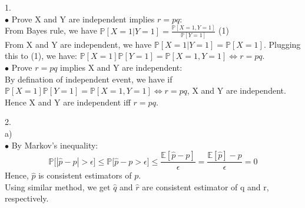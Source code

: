 \documentclass[10pt]{article}
\newenvironment{problem}[2][Problem]{\begin{trivlist}
\item[\hskip \labelsep {\bfseries #1}\hskip \labelsep {\bfseries #2.}]}{\end{trivlist}}
\begin{document}
\begin{problem}{3}
\item 1.\\
$\bullet$ Prove X and Y are independent implies $r=pq$:\\
From Bayes rule, we have $\mathbb{P}[X=1|Y=1]=\frac{\mathbb{P}[X=1, Y=1]}{\mathbb{P}[Y=1]}$ (1) \\
From X and Y are independent, we have $\mathbb{P}[X=1|Y=1]=\mathbb{P}[X=1] $. Plugging this to (1), we have: 
$\mathbb{P}[X=1] \mathbb{P}[Y=1]=\mathbb{P}[X=1, Y=1] \Leftrightarrow r=pq$.\\
$\bullet$ Prove $r=pq$ implies X and Y are independent: \\
By defination of independent event, we have if $\mathbb{P}[X=1]\mathbb{P}[Y=1]=\mathbb{P}[X=1, Y=1] \Leftrightarrow r=pq$, X and Y are independent.\\
Hence X and Y are independent iff $r=pq$.
\item 2.\\
a)\\
$\bullet$ By Markov's inequality:
\[ \mathbb{P}\Big[|\hat{p} - p| > \epsilon \Big] \leqslant \mathbb{P}\Big[\hat{p} - p > \epsilon \Big] \leqslant \frac{\mathbb{E}[\hat{p}-p]}{\epsilon} = \frac{\mathbb{E}[\hat{p}]- p}{\epsilon}=0 \]
Hence, $\hat{p}$ is consistent estimators of $p$.\\
Using similar method, we get $\hat{q}$ and $\hat{r}$ are consistent estimator of q and r, respectively.

\end{problem}
\end{document}
